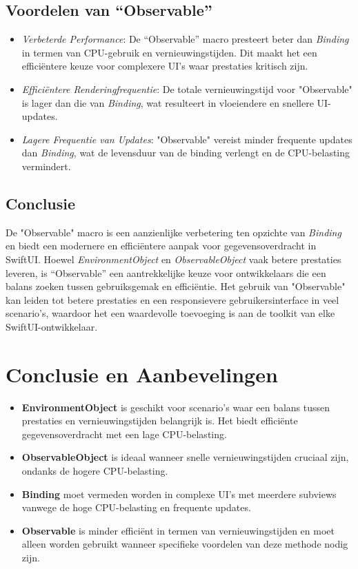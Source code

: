 \subsection{Voordelen van ``Observable''}
\begin{itemize}
    \item \textit{Verbeterde Performance}: De ``Observable'' macro presteert beter dan \textit{Binding} in termen van CPU-gebruik en vernieuwingstijden. Dit maakt het een efficiëntere keuze voor complexere UI's waar prestaties kritisch zijn.
    \item \textit{Efficiëntere Renderingfrequentie}: De totale vernieuwingstijd voor "Observable" is lager dan die van \textit{Binding}, wat resulteert in vloeiendere en snellere UI-updates.
    \item \textit{Lagere Frequentie van Updates}: "Observable" vereist minder frequente updates dan \textit{Binding}, wat de levensduur van de binding verlengt en de CPU-belasting vermindert.
\end{itemize}

\subsection{Conclusie}
De "Observable" macro is een aanzienlijke verbetering ten opzichte van \textit{Binding} en biedt een modernere en efficiëntere aanpak voor gegevensoverdracht in SwiftUI. Hoewel \textit{EnvironmentObject} en \textit{ObservableObject} vaak betere prestaties leveren, is ``Observable'' een aantrekkelijke keuze voor ontwikkelaars die een balans zoeken tussen gebruiksgemak en efficiëntie. Het gebruik van "Observable" kan leiden tot betere prestaties en een responsievere gebruikersinterface in veel scenario's, waardoor het een waardevolle toevoeging is aan de toolkit van elke SwiftUI-ontwikkelaar.


\newpage
\section{Conclusie en Aanbevelingen}
\begin{itemize}
    \item \textbf{EnvironmentObject} is geschikt voor scenario's waar een balans tussen prestaties en vernieuwingstijden belangrijk is. Het biedt efficiënte gegevensoverdracht met een lage CPU-belasting.
    \item \textbf{ObservableObject} is ideaal wanneer snelle vernieuwingstijden cruciaal zijn, ondanks de hogere CPU-belasting.
    \item \textbf{Binding} moet vermeden worden in complexe UI's met meerdere subviews vanwege de hoge CPU-belasting en frequente updates.
    \item \textbf{Observable} is minder efficiënt in termen van vernieuwingstijden en moet alleen worden gebruikt wanneer specifieke voordelen van deze methode nodig zijn.
\end{itemize}

